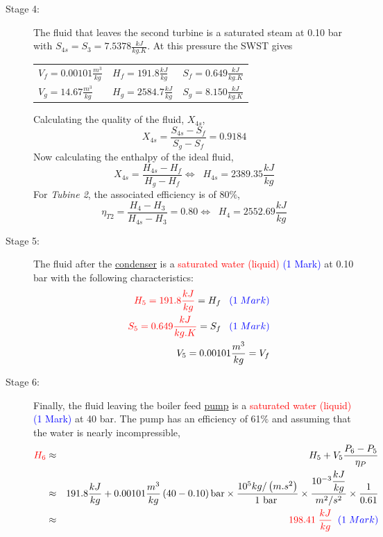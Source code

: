 \documentclass[12pt,twoside]{report}
\newcommand{\frc}{\displaystyle\frac}
\begin{document}
\begin{description}
\begin{enumerate}[(a)]
\begin{description}
\item [Stage 4:] The fluid that leaves the second turbine is a saturated steam at 0.10 bar with $S_{4s}=S_{3}=7.5378\frc{kJ}{kg.K}$. At this pressure the SWST gives
\begin{center}
\begin{tabular}{ l l l }
$V_{f}=0.00101 \frc{m^{3}}{kg}$  &  $H_{f}=191.8\frc{kJ}{kg}$   & $S_{f} = 0.649 \frc{kJ}{kg.K}$ \\
$V_{g}=14.67 \frc{m^{3}}{kg}$    &  $H_{g}=2584.7\frc{kJ}{kg}$  & $S_{g} = 8.150 \frc{kJ}{kg.K}$ \\
\end{tabular}
\end{center}

Calculating the quality of the fluid, $X_{4s}$,
\begin{displaymath}
X_{4s} = \frc{S_{4s}-S_{f}}{S_{g}-S_{f}} = 0.9184
\end{displaymath}
Now calculating the enthalpy of the ideal fluid,
\begin{displaymath}
X_{4s} = \frc{H_{4s}-H_{f}}{H_{g}-H_{f}} \Leftrightarrow \;\; H_{4s} = 2389.35 \frc{kJ}{kg}
\end{displaymath}
For {\it Tubine 2}, the associated efficiency is of 80$\%$,
\begin{displaymath}
\eta_{T2}=\frc{H_{4}-H_{3}}{H_{4s}-H_{3}}=0.80 \Leftrightarrow \;\; H_{4}=2552.69 \frc{kJ}{kg}
\end{displaymath}

\item [Stage 5:] The fluid after the \underline{condenser} is a \textcolor{red}{saturated water (liquid)} \textcolor{blue}{(1 Mark)} at 0.10 bar with the following characteristics:
\begin{eqnarray}
&& \textcolor{red}{H_{5}=191.8\frc{kJ}{kg}}=H_{f}\;\;\;\textcolor{blue}{(1\; Mark)} \nonumber \\
&& \textcolor{red}{S_{5}=0.649\frc{kJ}{kg.K}}=S_{f}\;\;\;\textcolor{blue}{(1\; Mark)} \nonumber \\
&& V_{5} = 0.00101 \frc{m^{3}}{kg} = V_{f} \nonumber
\end{eqnarray}

\item [Stage 6:] Finally, the fluid leaving the boiler feed \underline{pump} is a \textcolor{red}{saturated water (liquid)} \textcolor{blue}{(1 Mark)} at 40 bar. The pump has an efficiency of 61$\%$ and assuming that the water is nearly incompressible,
\begin{eqnarray}
\textcolor{red}{H_{6}} &\approx& H_{5} + V_{5} \frc{P_{6}-P_{5}}{\eta_{P}} \nonumber \\
     &\approx& 191.8 \frc{kJ}{kg} + 0.00101 \frc{m^{3}}{kg}\left(40-0.10\right)\text{bar} \times \frc{10^{5} kg/\left(m.s^{2}\right)}{1\text{ bar }} \times \frc{10^{-3} \frc{kJ}{kg}}{m^{2}/s^{2}}\times \frc{1}{0.61} \nonumber \\
     &\approx& \textcolor{red}{198.41\;\frc{kJ}{kg}}\;\;\textcolor{blue}{(1\; Mark)} \nonumber
\end{eqnarray}
%
\end{description}


\end{enumerate}
\end{description}
\end{document}
